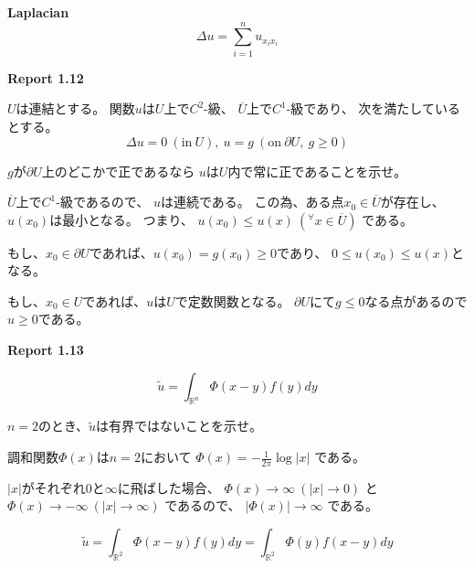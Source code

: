 \documentclass[12pt,b5paper]{ltjsarticle}
\begin{document}
\textbf{Laplacian}
\begin{equation}
 \Delta u = \sum_{i=1}^{n} u_{x_{i}x_{i}}
\end{equation}


\hrulefill

\textbf{Report 1.12}

$U$は連結とする。
関数$u$は$U$上で$C^2$-級、
$\overline{U}$上で$C^1$-級であり、
次を満たしているとする。
\begin{equation}
 \Delta u = 0\ (\text{in}\ U),\ u=g \ (\text{on}\ \partial U, \ g\geq 0)
\end{equation}

$g$が$\partial U$上のどこかで正であるなら
$u$は$U$内で常に正であることを示せ。

\dotfill

$\overline{U}$上で$C^1$-級であるので、
$u$は連続である。
この為、ある点$x_{0}\in\overline{U}$が存在し、
$u(x_{0})$は最小となる。
つまり、
$u(x_{0}) \leq u(x) \ ({}^{\forall}x\in\overline{U})$
である。

もし、$x_{0}\in\partial U$であれば、$u(x_{0})=g(x_{0})\geq 0$であり、
$0 \leq u(x_{0}) \leq u(x)$となる。

もし、$x_{0}\in U$であれば、$u$は$U$で定数関数となる。
$\partial U$にて$g\leq0$なる点があるので$u\geq 0$である。



\hrulefill

\textbf{Report 1.13}


\begin{equation}
 \tilde{u}
=\int_{\mathbb{R}^n}\Phi(x-y)f(y)dy
\end{equation}

$n=2$のとき、$\tilde{u}$は有界ではないことを示せ。

\dotfill

調和関数$\Phi(x)$は$n=2$において
$\Phi(x)=-\frac{1}{2\pi}\log{\lvert x \rvert}$
である。

$\lvert x \rvert$がそれぞれ$0$と$\infty$に飛ばした場合、
$\Phi(x)\to \infty \ (\lvert x \rvert \to 0)$
と
$\Phi(x)\to -\infty \ (\lvert x \rvert \to\infty)$
であるので、
$\lvert \Phi(x) \rvert \to \infty$
である。

\begin{equation}
 \tilde{u}
  =\int_{\mathbb{R}^2}\Phi(x-y)f(y)dy
  =\int_{\mathbb{R}^2}\Phi(y)f(x-y)dy
\end{equation}



\hrulefill
\end{document}
